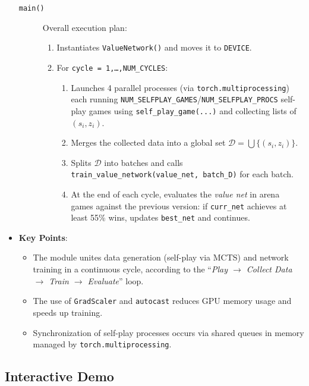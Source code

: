 \documentclass{report}
\begin{document}
\begin{itemize}
\begin{description}
      \item[\texttt{main()}]
        Overall execution plan:
        \begin{enumerate}
          \item Instantiates \texttt{ValueNetwork()} and moves it to \texttt{DEVICE}.
          \item For \texttt{cycle = 1,\dots,NUM\_CYCLES}:
            \begin{enumerate}
              \item Launches 4 parallel processes (via \texttt{torch.multiprocessing}) each running  
                    \texttt{NUM\_SELFPLAY\_GAMES}/\texttt{NUM\_SELFPLAY\_PROCS} self-play games using  
                    \texttt{self\_play\_game(...)} and collecting lists of \((s_i, z_i)\).
              \item Merges the collected data into a global set  
                    \(\mathcal{D} = \bigcup \{(s_i, z_i)\}\).
              \item Splits \(\mathcal{D}\) into batches and calls  
                    \texttt{train\_value\_network(value\_net, batch\_D)} for each batch.
              \item At the end of each cycle, evaluates the \emph{value net} in arena games  
                    against the previous version: if \texttt{curr\_net} achieves at least 55\% wins,  
                    updates \texttt{best\_net} and continues.
            \end{enumerate}
        \end{enumerate}
    \end{description}

  \item \textbf{Key Points}:
    \begin{itemize}
      \item The module unites data generation (self-play via MCTS) and network training in a continuous cycle, according to the “\textit{Play \(\rightarrow\) Collect Data \(\rightarrow\) Train \(\rightarrow\) Evaluate}” loop.
      \item The use of \texttt{GradScaler} and \texttt{autocast} reduces GPU memory usage and speeds up training.
      \item Synchronization of self-play processes occurs via shared queues in memory managed by \texttt{torch.multiprocessing}.
    \end{itemize}
\end{itemize}

\subsection{Interactive Demo}
\end{document}
